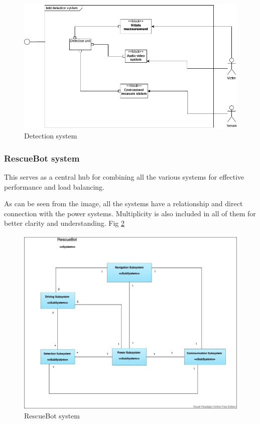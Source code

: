 \documentclass[10pt,journal,compsoc]{IEEEtran}
\begin{document}
\begin{figure}[h]
\includegraphics[scale=0.42]{detectionss}
\caption{Detection system}
\label{fig:detectionss}
\end{figure}

\subsubsection{RescueBot system}

This serves as a central hub for combining all the various systems for effective performance and load balancing.

As can be seen from the image, all the systems have a relationship and direct connection with the power systems. Multiplicity is also included in all of them for better clarity and understanding. Fig \ref{fig:RescueBotsys}

\begin{figure}[h]
\includegraphics[scale=0.35]{RescueBotsys}
\caption{RescueBot system}
\label{fig:RescueBotsys}
\end{figure}
\end{document}
